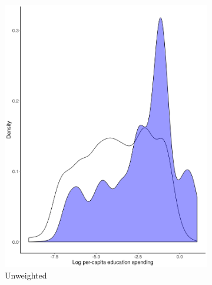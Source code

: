 \begin{figure}[htbp]
	\centering
	\begin{subfigure}[t]{0.48\textwidth}
		\centering
		\includegraphics[width=\textwidth]{plots/educ-dens.png}
		\caption{Unweighted} 
	\end{subfigure}
	~ 
	\begin{subfigure}[t]{0.48\textwidth}
		\centering

\end{subfigure}
\end{figure}
